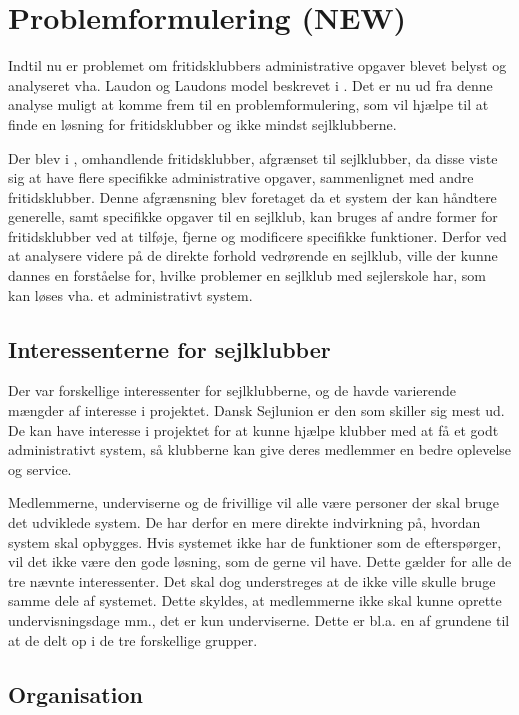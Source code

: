 \chapter{Problemformulering (NEW)}\label{chap:problemformulering-new}

Indtil nu er problemet om fritidsklubbers administrative opgaver blevet belyst og analyseret vha. Laudon og
Laudons model beskrevet i . Det er nu ud fra denne analyse muligt at
komme frem til en problemformulering, som vil hjælpe til at finde en løsning for fritidsklubber og ikke mindst
sejlklubberne.

Der blev i , omhandlende fritidsklubber, afgrænset til sejlklubber, da disse viste sig
at have flere specifikke administrative opgaver, sammenlignet med andre fritidsklubber. Denne afgrænsning blev foretaget
da et system der kan håndtere generelle, samt specifikke opgaver til en sejlklub, kan bruges af andre former for
fritidsklubber ved at tilføje, fjerne og modificere specifikke funktioner. Derfor ved at analysere videre på de
direkte forhold vedrørende en sejlklub, ville der kunne dannes en forståelse for, hvilke problemer en sejlklub
med sejlerskole har, som kan løses vha. et administrativt system.


\section{Interessenterne for sejlklubber}

Der var forskellige interessenter for sejlklubberne, og de havde varierende mængder af interesse i projektet.
Dansk Sejlunion er den som skiller sig mest ud. De kan have interesse i projektet for at kunne hjælpe klubber
med at få et godt administrativt system, så klubberne kan give deres medlemmer en bedre oplevelse og service.

Medlemmerne, underviserne og de frivillige vil alle være personer der skal bruge det udviklede system. De har
derfor en mere direkte indvirkning på, hvordan system skal opbygges. Hvis systemet ikke har de funktioner som
de efterspørger, vil det ikke være den gode løsning, som de gerne vil have. Dette gælder for alle de tre
nævnte interessenter. Det skal dog understreges at de ikke ville skulle bruge samme dele af systemet. Dette
skyldes, at medlemmerne ikke skal kunne oprette undervisningsdage mm., det er kun underviserne. Dette er bl.a.
en af grundene til at de delt op i de tre forskellige grupper.


\section{Organisation}

